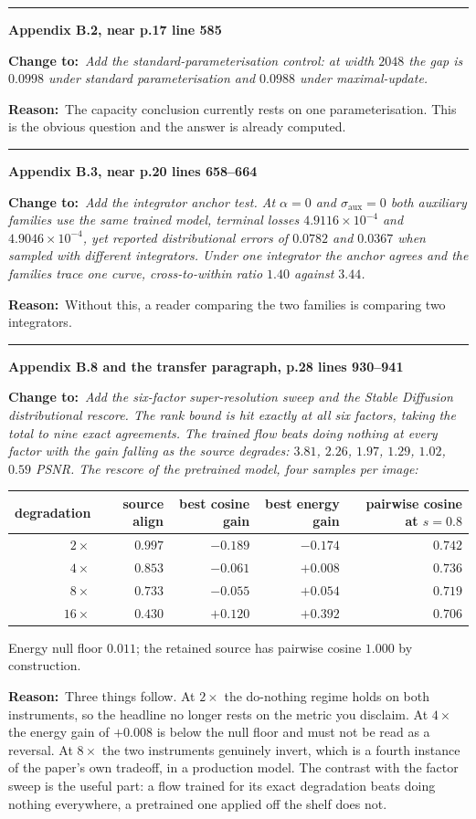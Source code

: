 \documentclass[11pt]{article}
\newcommand{\NEW}[1]{\medskip\noindent\textcolor{hd}{\rule{\textwidth}{0.6pt}}\par
  \noindent\textbf{#1}\par\smallskip}
\newcommand{\FIX}[1]{\noindent\textcolor{put}{\textbf{Change to:}}\ \begingroup\itshape #1\endgroup\par\smallskip}
\newcommand{\NOTE}[1]{\noindent\textbf{Reason:}\ #1\par}
\begin{document}
\NEW{Appendix B.2, near p.17 line 585}
\FIX{Add the standard-parameterisation control: at width $2048$ the gap is $0.0998$ under
standard parameterisation and $0.0988$ under maximal-update.}
\NOTE{The capacity conclusion currently rests on one parameterisation. This is the obvious
question and the answer is already computed.}

\NEW{Appendix B.3, near p.20 lines 658--664}
\FIX{Add the integrator anchor test. At $\alpha=0$ and $\sigma_{\mathrm{aux}}=0$ both auxiliary
families use the same trained model, terminal losses $4.9116\times10^{-4}$ and
$4.9046\times10^{-4}$, yet reported distributional errors of $0.0782$ and $0.0367$ when sampled
with different integrators. Under one integrator the anchor agrees and the families trace one
curve, cross-to-within ratio $1.40$ against $3.44$.}
\NOTE{Without this, a reader comparing the two families is comparing two integrators.}

\NEW{Appendix B.8 and the transfer paragraph, p.28 lines 930--941}
\FIX{Add the six-factor super-resolution sweep and the Stable Diffusion distributional rescore.
The rank bound is hit exactly at all six factors, taking the total to nine exact agreements. The
trained flow beats doing nothing at every factor with the gain \emph{falling} as the source
degrades: $3.81$, $2.26$, $1.97$, $1.29$, $1.02$, $0.59$ PSNR. The rescore of the pretrained
model, four samples per image:

\begin{center}
\begin{tabular}{@{}rrrrr@{}}
\toprule
degradation & source align & best cosine gain & best energy gain & pairwise cosine at $s=0.8$\\
\midrule
$2\times$  & $0.997$ & $-0.189$ & $-0.174$ & $0.742$\\
$4\times$  & $0.853$ & $-0.061$ & $+0.008$ & $0.736$\\
$8\times$  & $0.733$ & $-0.055$ & $+0.054$ & $0.719$\\
$16\times$ & $0.430$ & $+0.120$ & $+0.392$ & $0.706$\\
\bottomrule
\end{tabular}
\end{center}
Energy null floor $0.011$; the retained source has pairwise cosine $1.000$ by construction.}
\NOTE{Three things follow. At $2\times$ the do-nothing regime holds on both instruments, so the
headline no longer rests on the metric you disclaim. At $4\times$ the energy gain of $+0.008$ is
below the null floor and must not be read as a reversal. At $8\times$ the two instruments
genuinely invert, which is a fourth instance of the paper's own tradeoff, in a production model.
The contrast with the factor sweep is the useful part: a flow trained for its exact degradation
beats doing nothing everywhere, a pretrained one applied off the shelf does not.}
\end{document}
